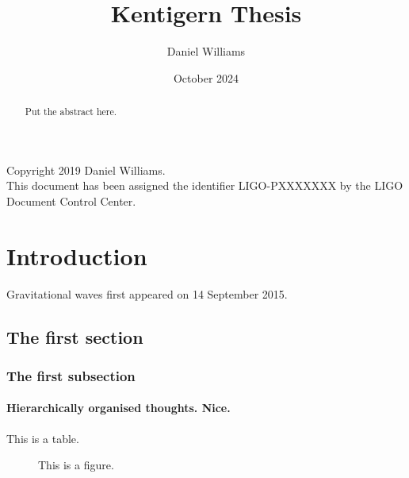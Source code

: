 \documentclass{kentigern}
\title{Kentigern Thesis}
\author{Daniel Williams}
\date{October 2024}
\begin{document}
\openright
\frontmatter
\thesistitle
\newpage \newpage

\begin{abstract}
    Put the abstract here.
\end{abstract}
\newpage

Copyright 2019 Daniel Williams.\\

This document has been assigned the identifier LIGO-PXXXXXXX by the LIGO Document Control Center.




\mainmatter
\chapter{Introduction}
\label{cha:intro}
Gravitational waves first appeared on 14 September 2015.
\section{The first section}
\subsection{The first subsection}
\subsubsection{Hierarchically organised thoughts. Nice.}

\begin{table}
    \caption{This is a table.}
\end{table}

\begin{figure}
    \caption{This is a figure.}
\end{figure}
\end{document}
